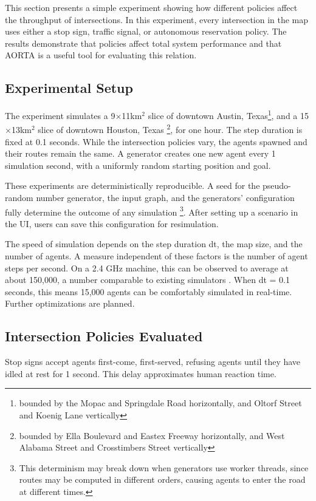 \documentclass[letterpaper, 10 pt, conference]{ieeeconf}  %
\begin{document}
This section presents a simple experiment showing how different policies affect
the throughput of intersections. In this experiment, every intersection in the
map uses either a stop sign, traffic signal, or autonomous reservation policy.
The results demonstrate that policies affect total system performance and that
AORTA is a useful tool for evaluating this relation.

\subsection{Experimental Setup}

The experiment simulates a 9$\times$11km$^{2}$ slice of downtown Austin,
Texas\footnote{bounded by the Mopac and Springdale Road horizontally, and Oltorf
Street and Koenig Lane vertically}, and a 15$\times$13km$^{2}$ slice of downtown
Houston, Texas \footnote{bounded by Ella Boulevard and Eastex Freeway
horizontally, and West Alabama Street and Crosstimbers Street vertically}, for
one hour. The step duration is fixed at 0.1 seconds. While the intersection
policies vary, the agents spawned and their routes remain the same.  A generator
creates one new agent every 1 simulation second, with a uniformly random
starting position and goal.

These experiments are deterministically reproducible. A seed for the
pseudo-random number generator, the input graph, and the generators'
configuration fully determine the outcome of any simulation \footnote{This
determinism may break down when generators use worker threads, since routes
may be computed in different orders, causing agents to enter the road at
different times.}. After setting up a scenario in the UI, users can save this
configuration for resimulation.

The speed of simulation depends on the step duration dt, the map size, and the
number of agents. A measure independent of these factors is the number of agent
steps per second. On a 2.4 GHz machine, this can be observed to average at about
150,000, a number comparable to existing simulators \cite{SUMOthesis}. When dt
= 0.1 seconds, this means 15,000 agents can be comfortably simulated in
real-time. Further optimizations are planned.

\subsection{Intersection Policies Evaluated}

Stop signs accept agents first-come, first-served, refusing agents until they
have idled at rest for 1 second. This delay approximates human reaction time.
\end{document}
